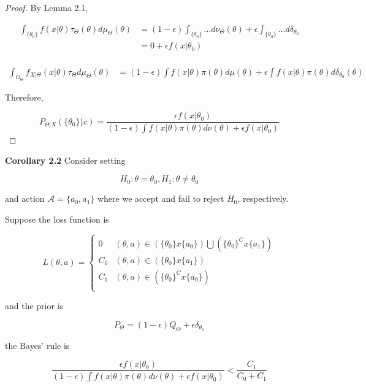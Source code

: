 \documentclass[11pt,fleqn]{book} %
\begin{document}
\begin{proof}
By Lemma 2.1, 

		\begin{align*}
			\int_{\{\theta_0\}} f(x|\theta) \tau_{\Theta}(\theta) d\mu_\Theta(\theta) &= (1 - \epsilon) \int_{\{\theta_0\}} \dots d\nu_\Theta(\theta) + \epsilon \int_{\{\theta_0\}} \dots d \delta_{\theta_0}\\
			&= 0 + \epsilon f(x|\theta_0)\\
		\end{align*}

		\begin{align*}
			\int_{\Omega_\Theta} f_{X|\Theta}(x|\theta) \tau_\Theta d \mu_\Theta(\theta) &= (1 - \epsilon) \int f(x|\theta) \pi(\theta) d\mu(\theta) + \epsilon \int f(x|\theta) \pi(\theta) d \delta_{\theta_0}(\theta)
		\end{align*}

	Therefore, 

			$$P_{\Theta|X}(\{\theta_0\}|x)  =\frac{\epsilon f(x|\theta_0)}{(1-\epsilon) \int f(x| \theta) \pi(\theta) d \nu(\theta) + \epsilon f(x|\theta_0) }$$
\end{proof}

\textbf{Corollary 2.2} Consider setting

		$$H_0: \theta = \theta_0, H_1: \theta \neq \theta_0 $$

and action $\mathcal{A} = \{a_0, a_1 \}$ where we accept and fail to reject $H_0$, respectively. 

Suppose the loss function is 

		$$L(\theta, a) = \left\{ \begin{array}{ll}
			0 & (\theta, a) \in (\{\theta_0\} x \{a_0 \}) \bigcup (\{\theta_0\}^C x \{a_1\})\\
			C_0 & (\theta, a) \in (\{\theta_0\} x \{a_1 \}) \\
			C_1 & (\theta, a) \in (\{\theta_0\}^C x \{a_0\})\\
		\end{array}\right. $$

and the prior is 

		$$P_\Theta = (1 - \epsilon) Q_\Theta + \epsilon \delta_{\theta_0} $$

the Bayes' rule is 

		$$\frac{\epsilon f(x|\theta_0)}{(1-\epsilon) \int f(x| \theta) \pi(\theta) d \nu(\theta) + \epsilon f(x|\theta_0) } < \frac{C_1}{C_0 + C_1} $$
\end{document}
